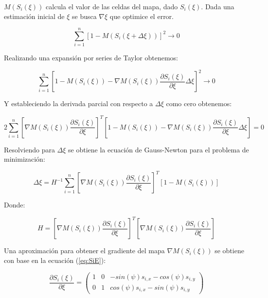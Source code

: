 \documentclass[10pt,a4paper]{article}
\begin{document}
$ M(S_{i}(\xi)) $ calcula el valor de las celdas del mapa, dado $ S_{i}(\xi) $. Dada una estimación inicial de $ \xi $ se busca $ \nabla\xi $ que optimice el error.

\begin{equation}
	\sum_{i=1}^{n} [1 - M(S_{i}(\xi + \Delta\xi))]^{2} \to 0
\end{equation}

Realizando una expansión por series de Taylor obtenemos:

\begin{equation}
	\sum_{i=1}^{n} \left[
		1 - M(S_{i}(\xi)) - 
			\nabla M(S_{i}(\xi)) \frac{\partial S_{i}(\xi)}{\partial \xi} \Delta\xi
	\right]^{2} \to 0
\end{equation}

Y estableciendo la derivada parcial con respecto a $ \Delta \xi $ como cero obtenemos:

\begin{equation}
	2 \sum_{i=1}^{n} \left[
		\nabla M(S_{i}(\xi)) \frac{\partial S_{i}(\xi)}{\partial \xi}
	\right]^{T} 
	\left[
		1 - M(S_{i}(\xi)) - 
			\nabla M(S_{i}(\xi)) \frac{\partial S_{i}(\xi)}{\partial \xi} \Delta\xi
	 \right] 
	 = 0
\end{equation}

Resolviendo para $ \Delta \xi $ se obtiene la ecuación de Gauss-Newton para el problema de minimización:

\begin{equation}
	\Delta \xi = H^{-1} \sum_{i=1}^{n} \left[
		\nabla M(S_{i}(\xi)) \frac{\partial S_{i}(\xi)}{\partial \xi}
	\right]^{T}
	\left[
		1 - M(S_{i}(\xi))
	 \right] 
\end{equation}

Donde:

\begin{equation}
	H = \left[
		\nabla M(S_{i}(\xi)) \frac{\partial S_{i}(\xi)}{\partial \xi}
	\right]^{T}
	\left[
		\nabla M(S_{i}(\xi)) \frac{\partial S_{i}(\xi)}{\partial \xi}
	\right]
\end{equation}

Una aproximación para obtener el gradiente del mapa $ \nabla M(S_{i}(\xi)) $ se obtiene con base en la ecuación (\ref{eq:SiE}):

\begin{equation}
	\frac{\partial S_{i}(\xi)}{\partial \xi} = 
	\begin{pmatrix}
		1 & 0 & -sin(\psi) s_{i,x} - cos(\psi)s_{i,y} \\
		0 & 1 & cos(\psi) s_{i,x} - sin(\psi)s_{i,y}
	\end{pmatrix}
\end{equation}
\end{document}
